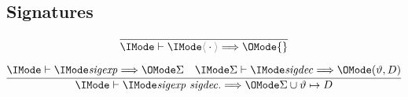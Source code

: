 \subsection*{Signatures\hfill \framebox{$\Elab{}{\SortSigExpr}{\Sigma}$}}

\begin{gather}
  \infer{
    \Elab{}{\ProdEmptySig}{\{\}}
  }{
  }\\[6pt]
  \infer{
    \Elab{}{\ProdExtendSig{\SortSigExpr}{\SortSigDecl}}{\Sigma\cup\vartheta\mapsto D}
  }{
    \Elab{}{\SortSigExpr}{\Sigma} &
    \Elab{\Sigma}{\SortSigDecl}{(\vartheta, D)}
  }
\end{gather}

